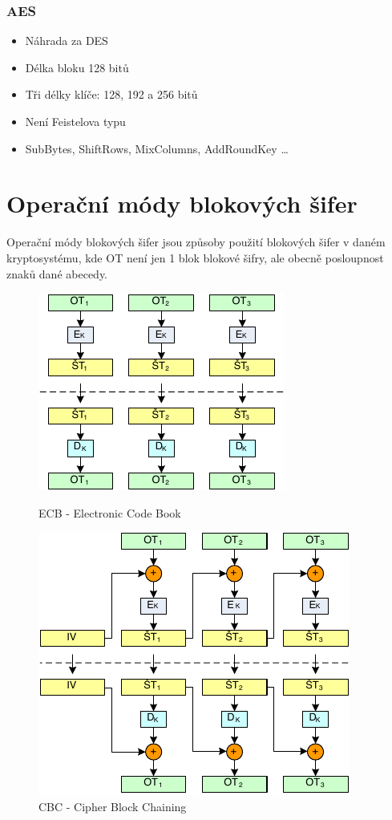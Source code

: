 \documentclass{szzclass}
\begin{document}
\subsubsection{AES}
\begin{itemize}
\item Náhrada za DES
\item Délka bloku 128 bitů
\item Tři délky klíče: 128, 192 a 256 bitů 
\item Není Feistelova typu
\item SubBytes, ShiftRows, MixColumns, AddRoundKey \dots
\end{itemize}

\section{Operační módy blokových šifer}
Operační módy blokových šifer jsou způsoby použití blokových šifer v daném kryptosystému, kde OT není jen 1 blok blokové šifry, ale obecně posloupnost znaků dané abecedy.

\begin{figure}[ht!]
\centering
\begin{minipage}{.5\textwidth}
  \centering
  \includegraphics[width=.75\linewidth]{topics/bi-spol-07/images/ecb}
  \caption{ECB - Electronic Code Book}
\end{minipage}%
\begin{minipage}{.5\textwidth}
  \centering
  \includegraphics[width=.75\linewidth]{topics/bi-spol-07/images/cbc}
  \caption{CBC - Cipher Block Chaining}
\end{minipage}
\end{figure}
\end{document}
